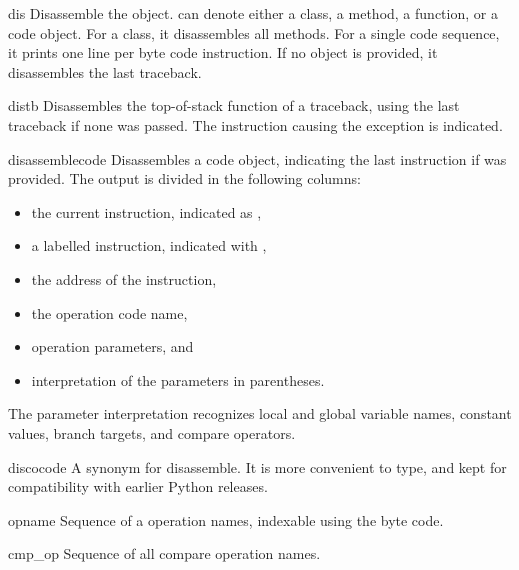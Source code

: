 \begin{funcdesc}{dis}{}
Disassemble the  object.  can denote
either a class, a method, a function, or a code object.  For a class,
it disassembles all methods.  For a single code sequence, it prints
one line per byte code instruction.  If no object is provided, it
disassembles the last traceback.
\end{funcdesc}

\begin{funcdesc}{distb}{}
Disassembles the top-of-stack function of a traceback, using the last
traceback if none was passed.  The instruction causing the exception
is indicated.
\end{funcdesc}

\begin{funcdesc}{disassemble}{code}
Disassembles a code object, indicating the last instruction if 
was provided.  The output is divided in the following columns:
\begin{itemize}
\item the current instruction, indicated as \code{-->},
\item a labelled instruction, indicated with \code{>>},
\item the address of the instruction,
\item the operation code name,
\item operation parameters, and
\item interpretation of the parameters in parentheses.
\end{itemize}
The parameter interpretation recognizes local and global
variable names, constant values, branch targets, and compare
operators.
\end{funcdesc}

\begin{funcdesc}{disco}{code}
A synonym for disassemble.  It is more convenient to type, and kept
for compatibility with earlier Python releases.
\end{funcdesc}

\begin{datadesc}{opname}
Sequence of a operation names, indexable using the byte code.
\end{datadesc}

\begin{datadesc}{cmp_op}
Sequence of all compare operation names.
\end{datadesc}

